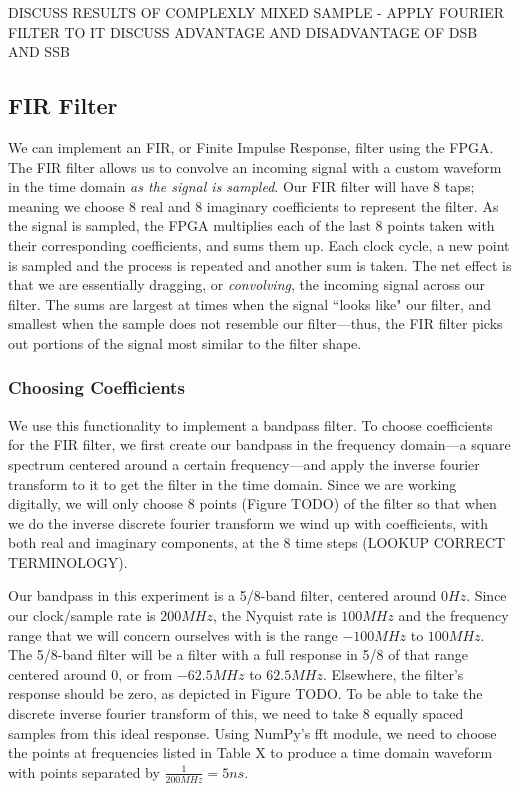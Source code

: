 \documentclass[12pt]{article}
\begin{document}
DISCUSS RESULTS OF
COMPLEXLY MIXED SAMPLE
- APPLY FOURIER FILTER TO IT
DISCUSS ADVANTAGE AND DISADVANTAGE OF DSB AND SSB

\subsection*{FIR Filter}
We can implement an FIR, or Finite Impulse Response, filter using the FPGA. The FIR filter allows us to convolve an incoming signal with a custom waveform in the time domain \textit{as the signal is sampled}. Our FIR filter will have 8 taps; meaning we choose 8 real and 8 imaginary coefficients to represent the filter. As the signal is sampled, the FPGA multiplies each of the last 8 points taken with their corresponding coefficients, and sums them up. Each clock cycle, a new point is sampled and the process is repeated and another sum is taken. The net effect is that we are essentially dragging, or \textit{convolving}, the incoming signal across our filter. The sums are largest at times when the signal ``looks like" our filter, and smallest when the sample does not resemble our filter---thus, the FIR filter picks out portions of the signal most similar to the filter shape.

\subsubsection*{Choosing Coefficients}
We use this functionality to implement a bandpass filter. To choose coefficients for the FIR filter, we first create our bandpass in the frequency domain---a square spectrum centered around a certain frequency---and apply the inverse fourier transform to it to get the filter in the time domain. Since we are working digitally, we will only choose 8 points (Figure TODO) of the filter so that when we do the inverse discrete fourier transform we wind up with coefficients, with both real and imaginary components, at the 8 time steps (LOOKUP CORRECT TERMINOLOGY).

Our bandpass in this experiment is a 5/8-band filter, centered around $0 Hz$. Since our clock/sample rate is $200MHz$, the Nyquist rate is $100MHz$ and the frequency range that we will concern ourselves with is the range $-100MHz$ to $100 MHz$. The 5/8-band filter will be a filter with a full response in 5/8 of that range centered around 0, or from $-62.5MHz$ to $62.5 MHz$. Elsewhere, the filter's response should be zero, as depicted in Figure TODO. To be able to take the discrete inverse fourier transform of this, we need to take 8 equally spaced samples from this ideal response. Using NumPy's fft module, we need to choose the points at frequencies listed in Table X to produce a time domain waveform with points separated by $\frac{1}{200MHz} = 5 ns$.
\end{document}
